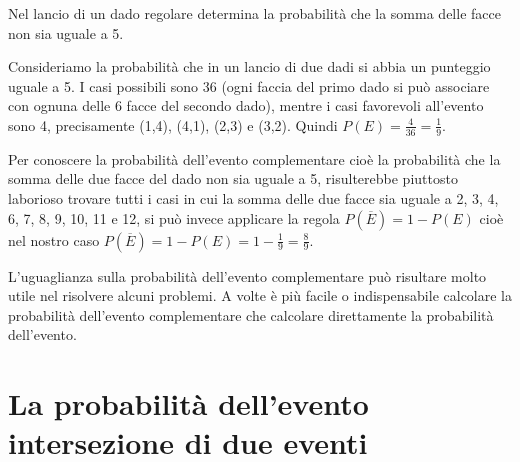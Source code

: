 \begin{esempio}
Nel lancio di un dado regolare determina la probabilità che la somma delle 
facce 
non sia uguale a 5.

Consideriamo la probabilità che in un lancio di due dadi si abbia un 
punteggio 
uguale a 5. I casi possibili sono 36 (ogni faccia del primo dado si può 
associare con ognuna delle 6 facce del secondo dado), mentre i casi 
favorevoli 
all'evento sono 4, precisamente (1,4), (4,1), (2,3) e (3,2). 
Quindi \(P(E)=\frac{4}{36}=\frac{1}{9}\).

Per conoscere la probabilità dell'evento complementare cioè la probabilità 
che la somma delle due facce del dado non sia uguale a 5, risulterebbe 
piuttosto laborioso trovare tutti i casi in cui la somma delle due facce sia 
uguale a 2, 3, 4, 6, 7, 8, 9, 10, 11 e 12, si può invece applicare la 
regola 
\(P(\overline E)=1-P(E)\) 
cioè nel nostro caso \(P(\overline E)=1-P(E)=1-\frac{1}{9}=\frac{8}{9}\).
\end{esempio}

\vspace{-5mm}

\osservazione L'uguaglianza sulla probabilità dell'evento complementare può 
risultare molto utile nel risolvere alcuni problemi. A volte è più facile o 
indispensabile calcolare la probabilità dell'evento complementare che 
calcolare 
direttamente la probabilità dell'evento.


\section{La probabilità dell'evento intersezione di due eventi}
\label{sec:09_intersezione}

